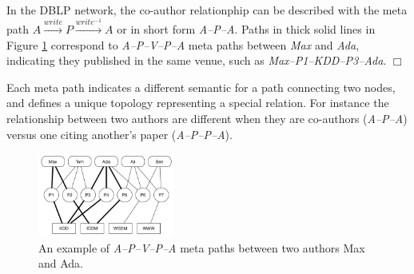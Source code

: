 \begin{example}
In the DBLP network, the co-author relationphip can be described with the meta path $A\xrightarrow{write}P\xrightarrow{write^{-1}}A$ or in short form \textit{A--P--A}. Paths in thick solid lines in Figure \ref{sampleNetwork} correspond to \textit{A--P--V--P--A} meta paths between \textit{Max} and \textit{Ada}, indicating they published in the same venue, such as \textit{Max--P1--KDD--P3--Ada}. $\Box$

\end{example}

Each meta path indicates a different semantic for a path connecting two nodes, and defines a unique topology representing a special relation. For instance the relationship between two authors are different when they are co-authors (\textit{A--P--A}) versus one citing another's paper (\textit{A--P--P--A}).

\begin{figure}[t]
  \centering
      \includegraphics[width=0.4\textwidth]{figs/exampleSocialNetwork.pdf}
  \caption{An example of \textit{A--P--V--P--A} meta paths between two authors Max and Ada.}\label{sampleNetwork}
\end{figure}





